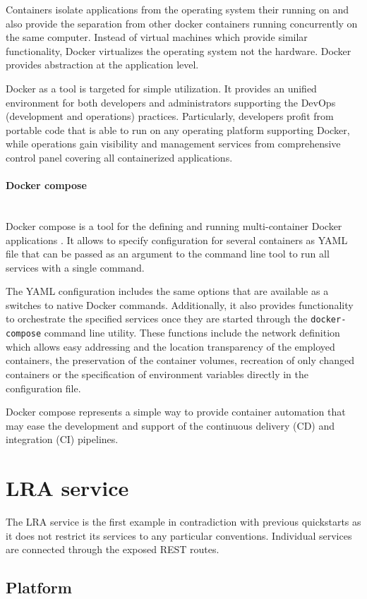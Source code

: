 \documentclass[oneside,
  digital, %
  table,   %
  nolof,     %
  nolot,     %
]{fithesis3}
\newcommand{\newlinepar}[1]{\paragraph{#1}\needspace{4\baselineskip}\mbox{}\\}
\begin{document}
Containers isolate applications from the operating system their running on and also provide the separation from other docker containers running concurrently on the same computer. Instead of virtual machines which provide similar functionality, Docker virtualizes the operating system not the hardware. Docker provides abstraction at the application level.

Docker as a tool is targeted for simple utilization. It provides an unified environment for both developers and administrators supporting the DevOps (development and operations) practices. Particularly, developers profit from portable code that is able to run on any operating platform supporting Docker, while operations gain visibility and management services from comprehensive control panel covering all containerized applications.

\newlinepar{Docker compose}

Docker compose is a tool for the defining and running multi-container Docker applications \cite{docker_compose}. It allows to specify configuration for several containers as YAML file that can be passed as an argument to the command line tool to run all services with a single command.

The YAML configuration includes the same options that are available as a switches to native Docker commands. Additionally, it also provides functionality to orchestrate the specified services once they are started through the \texttt{docker-compose} command line utility. These functions include the network definition which allows easy addressing and the location transparency of the employed containers, the preservation of the container volumes, recreation of only changed containers or the specification of environment variables directly in the configuration file. 

Docker compose represents a simple way to provide container automation that may ease the development and support of the continuous delivery (CD) and integration (CI) pipelines.


\section{LRA service}

The LRA service is the first example in contradiction with previous quickstarts as it does not restrict its services to any particular conventions. Individual services are connected through the exposed REST routes.

\subsection{Platform}
\end{document}

